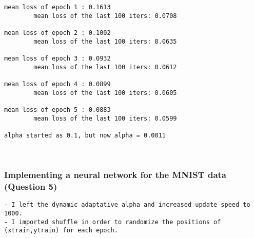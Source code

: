 \documentclass[11pt]{article}
\begin{document}
    \begin{Verbatim}[commandchars=\\\{\}]
mean loss of epoch 1 : 0.1613
        mean loss of the last 100 iters: 0.0708

mean loss of epoch 2 : 0.1002
        mean loss of the last 100 iters: 0.0635

mean loss of epoch 3 : 0.0932
        mean loss of the last 100 iters: 0.0612

mean loss of epoch 4 : 0.0899
        mean loss of the last 100 iters: 0.0605

mean loss of epoch 5 : 0.0883
        mean loss of the last 100 iters: 0.0599

alpha started as 0.1, but now alpha = 0.0011
    \end{Verbatim}

    \begin{center}
    \end{center}
    { \hspace*{\fill} \\}
    
    \hypertarget{implementing-a-neural-network-for-the-mnist-data-question-5}{%
\subsubsection{Implementing a neural network for the MNIST data
(Question
5)}\label{implementing-a-neural-network-for-the-mnist-data-question-5}}

\begin{verbatim}
- I left the dynamic adaptative alpha and increased update_speed to 1000.
- I imported shuffle in order to randomize the positions of (xtrain,ytrain) for each epoch.
\end{verbatim}
\end{document}
